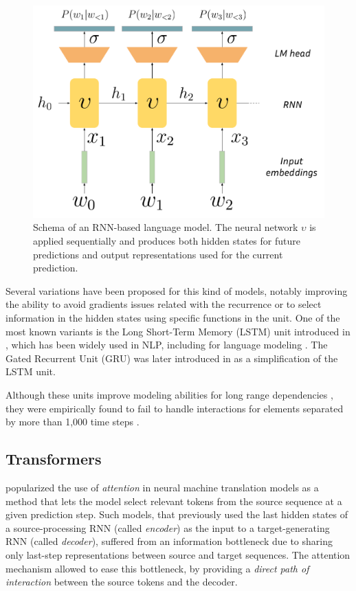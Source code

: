 \begin{figure}
    \centering
    \includegraphics[width=0.5\linewidth]{sources/related_works/imgs/RNN-LM.pdf}
    \caption{Schema of an RNN-based language model. The neural network $\upsilon$ is applied sequentially and produces both hidden states for future predictions and output representations used for the current prediction.}
    \label{fig:rnn}
\end{figure}

Several variations have been proposed for this kind of models, notably improving the ability to avoid gradients issues related with the recurrence or to select information in the hidden states using specific functions in the unit. One of the most known variants is the Long Short-Term Memory (LSTM) unit introduced in \citet{HochSchm97}, which has been widely used in NLP, including for language modeling \citep{miyamoto-cho-2016-gated}. The Gated Recurrent Unit (GRU) was later introduced in \citet{cho2014learningphraserepresentationsusing} as a simplification of the LSTM unit.

Although these units improve modeling abilities for long range dependencies \citep{rnn_eval}, they were empirically found to fail to handle interactions for elements separated by more than 1,000 time steps \citep{HochSchm97}.

\subsection{Transformers}
\label{ssec:transformers}

\citet{bahdanau_nmt} popularized the use of \textit{attention} in neural machine translation models as a method that lets the model select relevant tokens from the source sequence at a given prediction step. Such models, that previously used the last hidden states of a source-processing RNN (called \textit{encoder}) as the input to a target-generating RNN (called \textit{decoder}), suffered from an information bottleneck due to sharing only last-step representations between source and target sequences. The attention mechanism allowed to ease this bottleneck, by providing a \textit{direct path of interaction} between the source tokens and the decoder.

